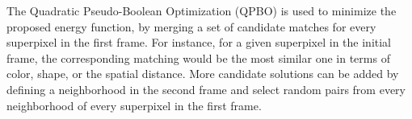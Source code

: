 
The Quadratic Pseudo-Boolean Optimization (QPBO) \cite{c3}\cite{c4} is used to minimize the proposed energy function, 
by merging a set of candidate matches for every superpixel in the first frame.
For instance, for a given superpixel in the initial frame, the corresponding 
matching would be the most similar one in terms of color, shape, or the spatial distance. More candidate solutions can be added by defining a
neighborhood in the second frame and select random pairs from every neighborhood of every superpixel
in the first frame. %


